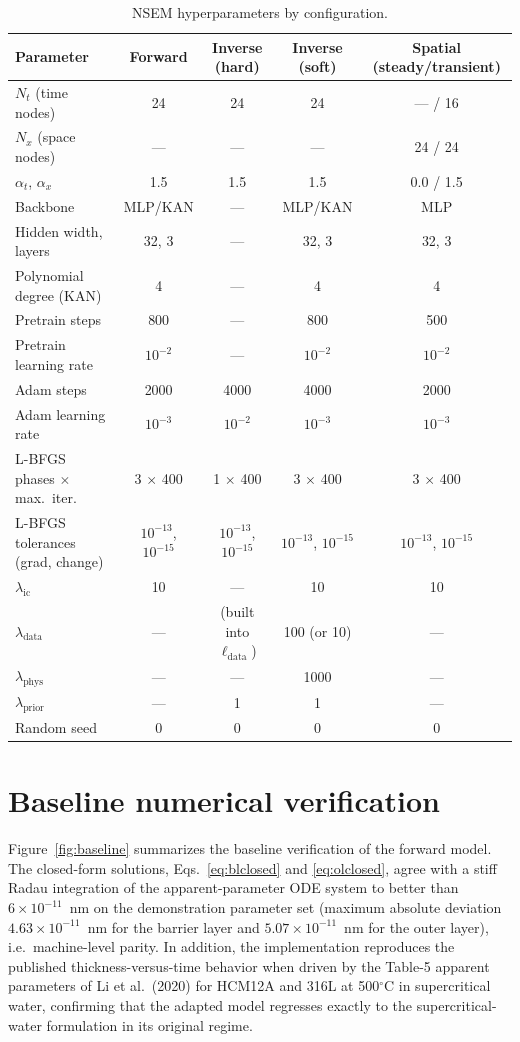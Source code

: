 \begin{table}[htbp]
\centering
\caption{NSEM hyperparameters by configuration.}
\label{tab:hyperparams}
\footnotesize
\setlength{\tabcolsep}{4pt}
\begin{tabular}{lcccc}
\toprule
Parameter & Forward & Inverse (hard) & Inverse (soft) & Spatial (steady/transient) \\
\midrule
$N_t$ (time nodes) & 24 & 24 & 24 & --- / 16 \\
$N_x$ (space nodes) & --- & --- & --- & 24 / 24 \\
$\alpha_t$, $\alpha_x$ & 1.5 & 1.5 & 1.5 & 0.0 / 1.5 \\
Backbone & MLP/KAN & --- & MLP/KAN & MLP \\
Hidden width, layers & 32, 3 & --- & 32, 3 & 32, 3 \\
Polynomial degree (KAN) & 4 & --- & 4 & 4 \\
Pretrain steps & 800 & --- & 800 & 500 \\
Pretrain learning rate & $10^{-2}$ & --- & $10^{-2}$ & $10^{-2}$ \\
Adam steps & 2000 & 4000 & 4000 & 2000 \\
Adam learning rate & $10^{-3}$ & $10^{-2}$ & $10^{-3}$ & $10^{-3}$ \\
L-BFGS phases $\times$ max.\ iter. & 3 $\times$ 400 & 1 $\times$ 400 & 3 $\times$ 400 & 3 $\times$ 400 \\
L-BFGS tolerances (grad, change) & $10^{-13}$, $10^{-15}$ & $10^{-13}$, $10^{-15}$ & $10^{-13}$, $10^{-15}$ & $10^{-13}$, $10^{-15}$ \\
$\lambda_\text{ic}$ & 10 & --- & 10 & 10 \\
$\lambda_\text{data}$ & --- & (built into $\ell_\text{data}$) & 100 (or 10) & --- \\
$\lambda_\text{phys}$ & --- & --- & 1000 & --- \\
$\lambda_\text{prior}$ & --- & 1 & 1 & --- \\
Random seed & 0 & 0 & 0 & 0 \\
\bottomrule
\end{tabular}
\end{table}

\section{Baseline numerical verification}
\label{sec:baseline}

Figure~\ref{fig:baseline} summarizes the baseline verification of the forward
model. The closed-form solutions, Eqs.~\eqref{eq:blclosed} and
\eqref{eq:olclosed}, agree with a stiff Radau integration of the
apparent-parameter ODE system to better than
$6 \times 10^{-11}$~nm on the demonstration parameter set
(maximum absolute deviation $4.63 \times 10^{-11}$~nm for the barrier layer
and $5.07 \times 10^{-11}$~nm for the outer layer), i.e.\ machine-level parity.
In addition, the implementation reproduces the published
thickness-versus-time behavior when driven by the Table-5 apparent parameters
of Li et al.\ (2020) for HCM12A and 316L at 500$^\circ$C in supercritical
water, confirming that the adapted model regresses exactly to the
supercritical-water formulation in its original regime.

